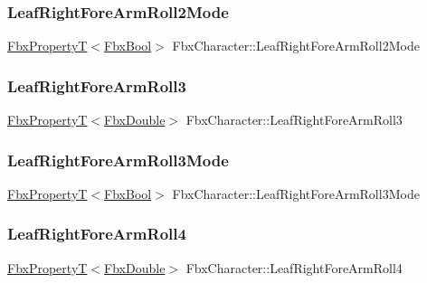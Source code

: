 \subsubsection{\texorpdfstring{Leaf\+Right\+Fore\+Arm\+Roll2\+Mode}{LeafRightForeArmRoll2Mode}}
{\footnotesize\ttfamily \hyperlink{class_fbx_property_t}{Fbx\+PropertyT}$<$\hyperlink{fbxtypes_8h_a92e0562b2fe33e76a242f498b362262e}{Fbx\+Bool}$>$ Fbx\+Character\+::\+Leaf\+Right\+Fore\+Arm\+Roll2\+Mode}

\mbox{\label{class_fbx_character_a29c4de5bb0939a59979f24f9ee72b3c9}} 
\subsubsection{\texorpdfstring{Leaf\+Right\+Fore\+Arm\+Roll3}{LeafRightForeArmRoll3}}
{\footnotesize\ttfamily \hyperlink{class_fbx_property_t}{Fbx\+PropertyT}$<$\hyperlink{fbxtypes_8h_a171e72a1c46fc15c1a6c9c31948c1c5b}{Fbx\+Double}$>$ Fbx\+Character\+::\+Leaf\+Right\+Fore\+Arm\+Roll3}

\mbox{\label{class_fbx_character_a554b248d818f38ed7bc22fef96362a65}} 
\subsubsection{\texorpdfstring{Leaf\+Right\+Fore\+Arm\+Roll3\+Mode}{LeafRightForeArmRoll3Mode}}
{\footnotesize\ttfamily \hyperlink{class_fbx_property_t}{Fbx\+PropertyT}$<$\hyperlink{fbxtypes_8h_a92e0562b2fe33e76a242f498b362262e}{Fbx\+Bool}$>$ Fbx\+Character\+::\+Leaf\+Right\+Fore\+Arm\+Roll3\+Mode}

\mbox{\label{class_fbx_character_a137288a59c2effdd4dc58be5d2dc27b8}} 
\subsubsection{\texorpdfstring{Leaf\+Right\+Fore\+Arm\+Roll4}{LeafRightForeArmRoll4}}
{\footnotesize\ttfamily \hyperlink{class_fbx_property_t}{Fbx\+PropertyT}$<$\hyperlink{fbxtypes_8h_a171e72a1c46fc15c1a6c9c31948c1c5b}{Fbx\+Double}$>$ Fbx\+Character\+::\+Leaf\+Right\+Fore\+Arm\+Roll4}

